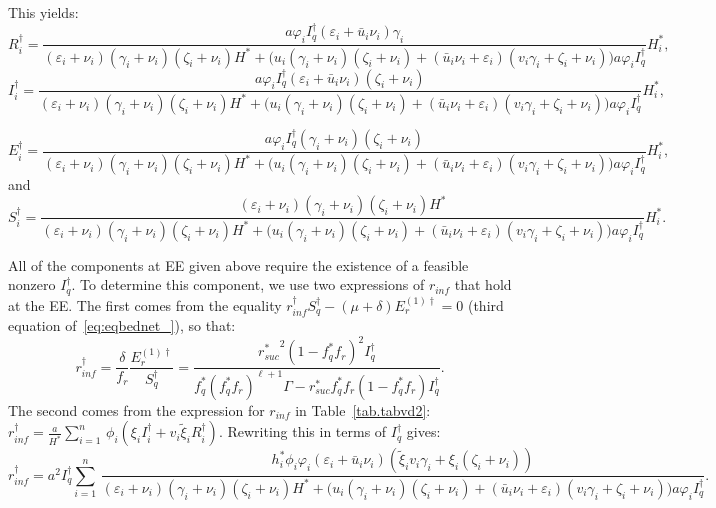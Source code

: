 \documentclass[a4paper]{article}
\newcommand{\dsum}{\displaystyle\sum}
\newcommand{\varphiVar}{r_{inf}}
\begin{document}
 This yields: \[R^\dagger _i =  \frac{a\varphi_i I^\dagger_q(\varepsilon_i+\bar u_i\nu_i)\gamma_i}{ (\varepsilon_i+\nu_i)(\gamma_i+\nu_i)(\zeta_i+\nu_i)H^* + \Big(u_i(\gamma_i+\nu_i)(\zeta_i+\nu_i) + (\bar u_i\nu_i+\varepsilon_i)(v_i\gamma_i + \zeta_i+\nu_i)\Big)a\varphi_i I^\dagger_q}H^*_i,\]
$$I_i^\dagger = \frac{a\varphi_i I^\dagger_q(\varepsilon_i + \bar u_i\nu_i)(\zeta_i+\nu_i)}{ (\varepsilon_i+\nu_i)(\gamma_i+\nu_i)(\zeta_i+\nu_i)H^* + \Big(u_i(\gamma_i+\nu_i)(\zeta_i+\nu_i) + (\bar u_i\nu_i+\varepsilon_i)(v_i\gamma_i + \zeta_i+\nu_i)\Big)a\varphi_i I^\dagger_q}H^*_i,
$$

$$E^\dagger _i =  \frac{a\varphi_i I^\dagger_q(\gamma_i+\nu_i)(\zeta_i+\nu_i)}{ (\varepsilon_i+\nu_i)(\gamma_i+\nu_i)(\zeta_i+\nu_i)H^* + \Big(u_i(\gamma_i+\nu_i)(\zeta_i+\nu_i) + (\bar u_i\nu_i+\varepsilon_i)(v_i\gamma_i + \zeta_i+\nu_i)\Big)a\varphi_i I^\dagger_q}H^*_i,$$ and $$S^\dagger _i  =  \frac{(\varepsilon_i+\nu_i)(\gamma_i+\nu_i)(\zeta_i+\nu_i)H^*}{ (\varepsilon_i+\nu_i)(\gamma_i+\nu_i)(\zeta_i+\nu_i)H^* + \Big(u_i(\gamma_i+\nu_i)(\zeta_i+\nu_i) + (\bar u_i\nu_i+\varepsilon_i)(v_i\gamma_i + \zeta_i+\nu_i) \Big)a\varphi_i I^\dagger_q}H^*_i.$$

\noindent All of the components at EE given above require the existence of  a feasible nonzero $I_q^\dagger $. To determine this component, we use  two  expressions of $\varphiVar $ that hold at the EE.
The first comes  from the equality $\varphiVar ^\dagger  S^\dagger _q-(\mu+\delta)E_r^{(1)\dagger }=0$ (third equation of~\eqref{eq:eqbednet_}), so that: \begin{equation}\label{eq:eqphi}r_{inf}^\dagger  = \frac{\delta}{f_r}\frac{E_r^{(1)\dagger }}{S^\dagger _q}=\frac{{r_{suc}^*}^2(1-f^*_qf_r)^2 I_q^\dagger }{f^*_q(f^*_qf_r)^{\ell+1}\Gamma-r_{suc}^* f^*_qf_r (1-f^*_qf_r)I_q^\dagger }.\end{equation}
The second comes from  the expression for $r_{inf}$ in Table~\ref{tab.tabvd2}:  $r_{inf}^\dagger = \frac{a}{H^*}\dsum_{i=1}^n\,\phi_i (\xi_i I_i^\dagger+v_i\widetilde\xi_i R_i^\dagger) $.   Rewriting this in terms of  $I^\dagger_q$ gives:
\begin{equation}\label{eq:eqphi1}r_{inf}^\dagger = a^2I^\dagger_q\dsum_{i=1}^n\, \frac{h_i^*\phi_i\varphi_i (\varepsilon_i+\bar u_i\nu_i)\left(\widetilde\xi_iv_i\gamma_i+\xi_i(\zeta_i+\nu_i)\right)}{ (\varepsilon_i+\nu_i)(\gamma_i+\nu_i)(\zeta_i+\nu_i)H^* + \Big(u_i(\gamma_i+\nu_i)(\zeta_i+\nu_i) + (\bar u_i\nu_i+\varepsilon_i)(v_i\gamma_i + \zeta_i+\nu_i) \Big)a\varphi_i I^\dagger_q}.\end{equation}
\end{document}
